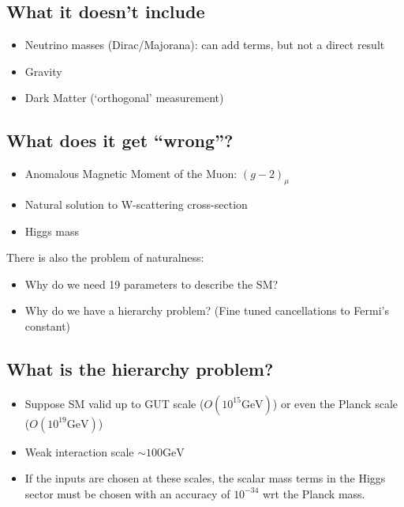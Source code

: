 \documentclass{beamer}
\begin{document}
\subsection{What it doesn't include}
\begin{frame}{\insertsubsection}
  \begin{itemize}
    \item Neutrino masses (Dirac/Majorana): can add terms, but not a direct result
    \item Gravity
    \item Dark Matter (`orthogonal' measurement)
  \end{itemize}
\end{frame}

\subsection{What does it get ``wrong''?}
\begin{frame}{\insertsubsection}
  \begin{itemize}
    \item Anomalous Magnetic Moment of the Muon: $(g-2)_{\mu}$
    \item Natural solution to W-scattering cross-section
    \item Higgs mass 
  \end{itemize}
  There is also the problem of naturalness:
  \begin{itemize}
    \item Why do we need 19 parameters to describe the SM?
    \item Why do we have a hierarchy problem? (Fine tuned cancellations to
    Fermi's constant)
  \end{itemize}
\end{frame}

\subsection{What is the hierarchy problem?}
\begin{frame}{\insertsubsection}
  \begin{itemize}
    \item Suppose SM valid up to GUT scale ($O(10^{15}\textrm{GeV})$) or even
    the Planck scale ($O(10^{19}\textrm{GeV})$)
    \item Weak interaction scale $\sim100\textrm{GeV}$
    \item If the inputs are chosen at these scales, the scalar mass terms in
    the Higgs sector must be chosen with an accuracy of $10^{-34}$ wrt the
    Planck mass.
  \end{itemize}
\end{frame}
\end{document}
